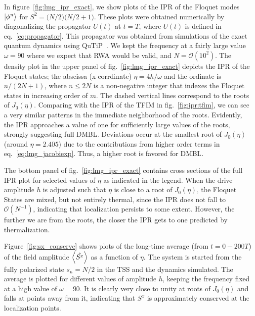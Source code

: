 \documentclass[%
reprint,
superscriptaddress,
amsmath,amssymb,
aps,
prb,
showkeys,
]{revtex4-2}
\begin{document}
In figure~\ref{fig:lmg_ipr_exact}, we show plots of the IPR of the Floquet modes $\ket{\phi^n}$ for $S^2 = \big(N/2\big)\big(N/2 + 1\big)$.
These plots were obtained numerically by diagonalizing the propagator $U(t)$ at $t=T$, where $U(t)$ is defined in eq.~\ref{eq:propagator}. This propagator was obtained from simulations of the exact quantum dynamics using QuTiP~\cite{qutip}. We kept the frequency at a fairly large value $\omega = 90$ where we expect that RWA would be valid, and $N=\mathcal{O}(10^2)$. The density plot in the upper panel of fig.~\ref{fig:lmg_ipr_exact} depicts the IPR of the Floquet states; the abscissa (x-corrdinate)  $\eta=4h/\omega$ and the ordinate is $n/(2N+1)$, where $n\leq 2N$ is a non-negative integer that indexes the Floquet states in increasing order of $m$. The dashed vertical lines correspond to the roots of $J_0(\eta)$. Comparing with the IPR of the TFIM in fig.~\ref{fig:ipr:tfim}, we can see a very similar patterns in the immediate neighborhood of the roots. Evidently, the IPR approaches a value of one for sufficiently large values of the roots, strongly suggesting full DMBL. Deviations occur at the smallest root of $J_0(\eta)$ (around $\eta = 2.405$) due to the contributions from higher order terms in eq.~\ref{eq:lmg_jacobiexp}. Thus, a higher root is favored for DMBL.

The bottom panel of fig.~\ref{fig:lmg_ipr_exact} contains cross sections of the full IPR plot for selected values of $\eta$ as indicated in the legend. When the drive amplitude $h$ is adjusted such that $\eta$ is close to a root of $J_0(\eta)$, the Floquet States are mixed, but not entirely thermal, since the IPR does not fall to $\mathcal{O}(N^{-1})$, indicating that localization persists to some extent. However, the further we are from the roots, the closer the IPR gets to one predicted by thermalization.

Figure~\ref{fig:sx_conserve} shows plots of the long-time average (from $t=0-200T$) of the field amplitude $\expval{\hat{S^x}}$ as a function of $\eta$. The system is started from the fully polarized state $s_n=N/2$ in the TSS and the dynamics simulated. The average is plotted for different values of amplitude $h$, keeping the frequency fixed at a high value of $\omega=90$. It is clearly very close to unity at roots of $J_0(\eta)$ and falls at points away from it, indicating that $S^x$ is approximately conserved at the localization points.
\end{document}
